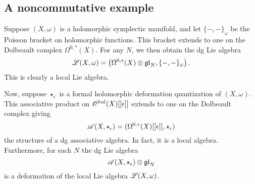
\subsection{A noncommutative example}

Suppose $(X,\omega)$ is a holomorphic symplectic manifold, and let $\{-,-\}_\omega$ be the Poisson bracket on holomorphic functions. 
This bracket extends to one on the Dolbeault complex $\Omega^{0,*}(X)$. 
For any $N$, we then obtain the dg Lie algebra
\[
\mathscr L(X,\omega) = \left(\Omega^{0,*}(X) \otimes {\mathfrak{gl}}_N , \{-,-\}_\omega\right) .
\]
This is clearly a local Lie algebra. 

Now, suppose $\star_\epsilon$ is a formal holomorphic deformation quantization of $(X,\omega)$. 
This associative product on $\mathscr O^{hol}(X)[[\epsilon]]$ extends to one on the Dolbeault complex giving
\[
\mathscr A(X,\star_{\epsilon}) = (\Omega^{0,*}(X)[[\epsilon]], \star_{\epsilon})
\]
the structure of a dg associative algebra. 
In fact, it is a local algebra. 
Furthermore, for each $N$ the dg Lie algebra 
\[
\mathscr A(X, \star_{\epsilon}) \otimes {\mathfrak{gl}}_N
\]
is a deformation of the local Lie algebra $\mathscr L(X,\omega)$. 

